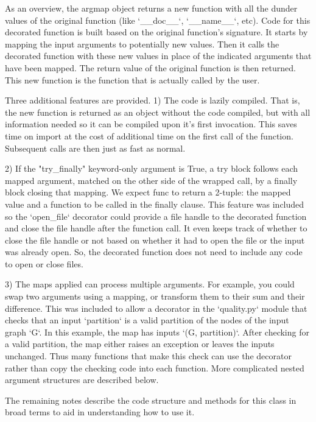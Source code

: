 \begin{DoxyVerb}
As an overview, the argmap object returns a new function with all the
dunder values of the original function (like `__doc__`, `__name__`, etc).
Code for this decorated function is built based on the original function's
signature. It starts by mapping the input arguments to potentially new
values. Then it calls the decorated function with these new values in place
of the indicated arguments that have been mapped. The return value of the
original function is then returned. This new function is the function that
is actually called by the user.

Three additional features are provided.
    1) The code is lazily compiled. That is, the new function is returned
    as an object without the code compiled, but with all information
    needed so it can be compiled upon it's first invocation. This saves
    time on import at the cost of additional time on the first call of
    the function. Subsequent calls are then just as fast as normal.

    2) If the "try_finally" keyword-only argument is True, a try block
    follows each mapped argument, matched on the other side of the wrapped
    call, by a finally block closing that mapping.  We expect func to return
    a 2-tuple: the mapped value and a function to be called in the finally
    clause.  This feature was included so the `open_file` decorator could
    provide a file handle to the decorated function and close the file handle
    after the function call. It even keeps track of whether to close the file
    handle or not based on whether it had to open the file or the input was
    already open. So, the decorated function does not need to include any
    code to open or close files.

    3) The maps applied can process multiple arguments. For example,
    you could swap two arguments using a mapping, or transform
    them to their sum and their difference. This was included to allow
    a decorator in the `quality.py` module that checks that an input
    `partition` is a valid partition of the nodes of the input graph `G`.
    In this example, the map has inputs `(G, partition)`. After checking
    for a valid partition, the map either raises an exception or leaves
    the inputs unchanged. Thus many functions that make this check can
    use the decorator rather than copy the checking code into each function.
    More complicated nested argument structures are described below.

The remaining notes describe the code structure and methods for this
class in broad terms to aid in understanding how to use it.


\end{DoxyVerb}

